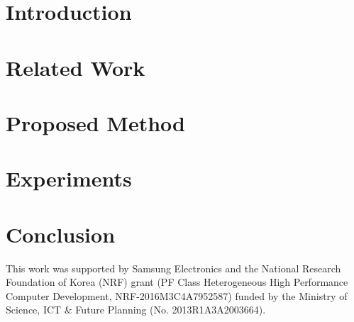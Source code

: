 \documentclass[manuscript]{acmart}
\begin{document}


\maketitle

\section{Introduction}


\section{Related Work}


\section{Proposed Method}


\section{Experiments}


\section{Conclusion}



\begin{acks}
This work was supported by Samsung Electronics and the National Research Foundation of Korea (NRF) grant (PF Class Heterogeneous High Performance Computer Development, NRF-2016M3C4A7952587) funded by the Ministry of Science, ICT \& Future Planning (No. 2013R1A3A2003664).
\end{acks}


\end{document}
